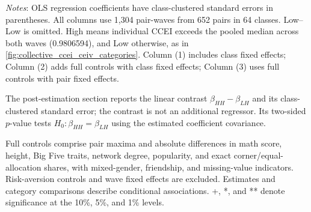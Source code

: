 \documentclass[11 pt]{article}
\renewcommand{\arraystretch}{1.2} %
\begin{document}
\begin{table}[H]
\centering
\singlespacing
\small
\caption{Individual Rationality and Collective Outcomes}
\label{tab:collective_ccei_ceiv_categories}
\setlength{\tabcolsep}{9pt}
\renewcommand{\arraystretch}{1.12}

\par\vspace{8pt}
\begin{minipage}{\textwidth}
\footnotesize
\emph{Notes}: OLS regression coefficients have class-clustered standard errors in parentheses. All columns
use 1,304 pair-waves from 652 pairs in 64 classes. Low--Low is omitted. High means individual CCEI exceeds
the pooled median across both waves (0.9806594), and Low otherwise, as in \autoref{fig:collective_ccei_ceiv_categories}. Column (1) includes
class fixed effects; Column (2) adds full controls with class fixed effects; Column (3) uses full controls
with pair fixed effects.

The post-estimation section reports the linear contrast $\beta_{HH}-\beta_{LH}$ and its class-clustered
standard error; the contrast is not an additional regressor. Its two-sided $p$-value tests
$H_0:\beta_{HH}=\beta_{LH}$ using the estimated coefficient covariance.

Full controls comprise pair maxima and absolute differences in math score, height, Big Five traits,
network degree, popularity, and exact corner/equal-allocation shares, with mixed-gender, friendship,
and missing-value indicators. Risk-aversion controls and wave fixed effects are excluded.
Estimates and category comparisons describe conditional associations. +, *, and ** denote significance
at the 10\%, 5\%, and 1\% levels.
\end{minipage}
\end{table}

\end{document}
